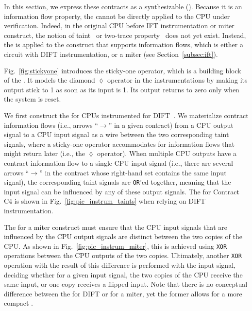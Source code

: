 
In this section, we express these contracts as a synthesizable \pici (\PICI).
Because it is an information flow property, the \PICI cannot be directly applied to the CPU under verification.
Indeed, in the original CPU before IFT instrumentation or miter construct, the notion of taint~\cite{solt2022cellift,ceesay2024mucfi} or two-trace property~\cite{wang2023specification,dinesh2024conjunct,dinesh2025h,tan2025contractshadowlogic} does not yet exist.
Instead, the \PICI is applied to the construct that supports information flows, which is either a circuit with DIFT instrumentation, or a miter (see Section~\ref{subsec:ift}).

Fig.~\ref{fig:stickyone} introduces the sticky-one operator, which is a building block of the \PICI.
It models the diamond $\lozenge$ operator in the instrumentations by making its output stick to 1 as soon as its input is 1.
Its output returns to zero only when the system is reset.

We first construct the \PICI for CPUs instrumented for DIFT~\cite{tiwari2009complete,solt2022cellift}.
We materialize contract information flows (i.e., arrows ``$\rightarrow$'' in a given contract) from a CPU output signal to a CPU input signal as a wire between the two corresponding taint signals, where a sticky-one operator accommodates for information flows that might return later (i.e., the $\lozenge$ operator).
When multiple CPU outputs have a contract information flow to a single CPU input signal (i.e., there are several arrows ``$\rightarrow$'' in the contract whose right-hand set contains the same input signal), the corresponding taint signals are \texttt{OR}'ed together, meaning that the input signal can be influenced by any of these output signals.
The \PICI for Contract C4 is shown in Fig.~\ref{fig:pic_instrum_taints} when relying on DIFT instrumentation.

The \PICI for a miter construct must ensure that the CPU input signals that are influenced by the CPU output signals are distinct between the two copies of the CPU.
As shown in Fig.~\ref{fig:pic_instrum_miter}, this is achieved using \texttt{XOR} operations between the CPU outputs of the two copies.
Ultimately, another \texttt{XOR} operation with the result of this difference is performed with the input signal, deciding whether for a given input signal, the two copies of the CPU receive the same input, or one copy receives a flipped input.
Note that there is no conceptual difference between the \PICI for DIFT or for a miter, yet the former allows for a more compact \PICI.

